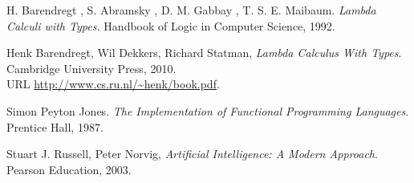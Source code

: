 \documentclass[12pt,a4paper]{report}
\begin{document}
\begin{thebibliography}{9}
H. Barendregt , S. Abramsky , D. M. Gabbay , T. S. E. Maibaum.
\emph{Lambda Calculi with Types.} 
Handbook of Logic in Computer Science, 1992. 


  Henk Barendregt, Wil Dekkers, Richard Statman,
  \emph{Lambda Calculus With Types}.
  Cambridge University Press,
  2010. \\
  URL \url{http://www.cs.ru.nl/~henk/book.pdf}.

Simon Peyton Jones. 
\emph{The Implementation of Functional Programming Languages}. 
Prentice Hall, 1987.


	Stuart J. Russell, Peter Norvig,
	\emph{Artificial Intelligence: A Modern Approach}.
	Pearson Education,
	2003. 

\end{thebibliography}

	
	
\end{document}
